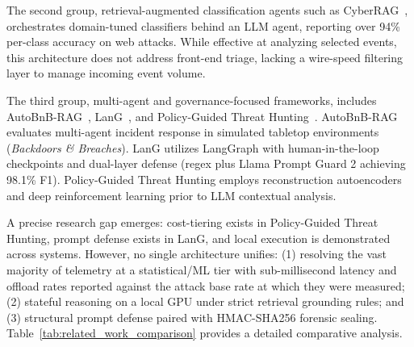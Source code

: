 The second group, retrieval-augmented classification agents such as CyberRAG~\cite{cyberrag2025}, orchestrates domain-tuned classifiers behind an LLM agent, reporting over 94\% per-class accuracy on web attacks. While effective at analyzing selected events, this architecture does not address front-end triage, lacking a wire-speed filtering layer to manage incoming event volume.

The third group, multi-agent and governance-focused frameworks, includes AutoBnB-RAG~\cite{autobnb2025}, LanG~\cite{lang2026}, and Policy-Guided Threat Hunting~\cite{splunkllm2026}. AutoBnB-RAG evaluates multi-agent incident response in simulated tabletop environments (\textit{Backdoors \& Breaches}). LanG utilizes LangGraph with human-in-the-loop checkpoints and dual-layer defense (regex plus Llama Prompt Guard 2 achieving 98.1\% F1). Policy-Guided Threat Hunting employs reconstruction autoencoders and deep reinforcement learning prior to LLM contextual analysis.

A precise research gap emerges: cost-tiering exists in Policy-Guided Threat Hunting, prompt defense exists in LanG, and local execution is demonstrated across systems. However, no single architecture unifies: (1) resolving the vast majority of telemetry at a statistical/ML tier with sub-millisecond latency and offload rates reported against the attack base rate at which they were measured; (2) stateful reasoning on a local GPU under strict retrieval grounding rules; and (3) structural prompt defense paired with HMAC-SHA256 forensic sealing. Table~\ref{tab:related_work_comparison} provides a detailed comparative analysis.

